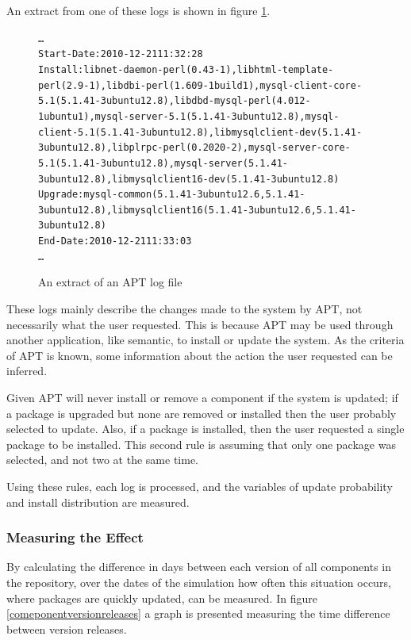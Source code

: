 An extract from one of these logs is shown in figure \ref{aptlog}.
\begin{figure}[htp]
\begin{center}
\begin{alltt}
\ldots
Start-Date: 2010-12-21 11:32:28
Install: libnet-daemon-perl (0.43-1), libhtml-template-perl (2.9-1), libdbi-perl (1.609-1build1), mysql-client-core-5.1 (5.1.41-3ubuntu12.8), libdbd-mysql-perl (4.012-1ubuntu1), mysql-server-5.1 (5.1.41-3ubuntu12.8), mysql-client-5.1 (5.1.41-3ubuntu12.8), libmysqlclient-dev (5.1.41-3ubuntu12.8), libplrpc-perl (0.2020-2), mysql-server-core-5.1 (5.1.41-3ubuntu12.8), mysql-server (5.1.41-3ubuntu12.8), libmysqlclient16-dev (5.1.41-3ubuntu12.8)
Upgrade: mysql-common (5.1.41-3ubuntu12.6, 5.1.41-3ubuntu12.8), libmysqlclient16 (5.1.41-3ubuntu12.6, 5.1.41-3ubuntu12.8)
End-Date: 2010-12-21 11:33:03
\ldots
\end{alltt}
\caption[APT log extract]{An extract of an APT log file}
\label{aptlog}
\end{center}
\end{figure}

These logs mainly describe the changes made to the system by APT, not necessarily what the user requested.
This is because APT may be used through another application, like semantic, to install or update the system.
As the criteria of APT is known, some information about the action the user requested can be inferred.

Given APT will never install or remove a component if the system is updated; 
if a package is upgraded but none are removed or installed then the user probably selected to update.
Also, if a package is installed, then the user requested a single package to be installed.
This second rule is assuming that only one package was selected, and not two at the same time.

Using these rules, each log is processed, and the variables of update probability and install distribution are measured.


\subsubsection{Measuring the Effect}
By calculating the difference in days between each version of all components in the repository, 
over the dates of the simulation how often this situation occurs, where packages are quickly updated, can be measured.
In figure \ref{comeponentversionreleases} a graph is presented measuring the time difference between version releases.
 
